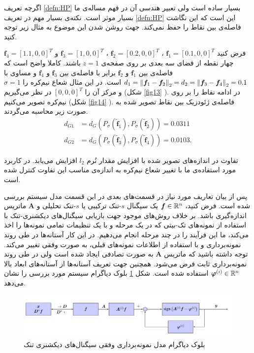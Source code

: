 اگرچه تعریف 
\eqref{defn:HP}
بسیار ساده است ولی تعبیر هندسی آن در فهم مساله‌ی ما بسیار موثر است. نکته‌ی بسیار مهم در تعریف
\eqref{defn:HP}
این است که این نگاشت فاصله‌ی بین نقاط را حفظ نمی‌کند. جهت روشن شدن این موضوع به مثال زیر توجه کنید.

فرض کنید 
$ \bm{f}_{1}=[0.1,0,0]^{T} $
،
$ \bm{f}_{2}=[0.2,0,0]^{T} $
،
$ \bm{f}_{3}=[1,0,0]^{T} $
و 
$ \bm{f}_{4}=[1.1,0,0]^{T} $
چهار نقطه از فضای سه بعدی بر روی صفحه‌ی
$ z=1 $
باشند. کاملا واضح است که فاصله‌ی بین 
 $ \bm{f}_{1} $
و
 $ \bm{f}_{2} $
برابر با فاصله‌ی بین
 $ \bm{f}_{3} $
و 
 $ \bm{f}_{4} $
و مساوی با
$ d_{1}=\left\lVert\bm{f}_{1}-\bm{f}_{2}\right\rVert_{2}=d_{2}=\left\lVert\bm{f}_{3}-\bm{f}_{4}\right\rVert_{2}= 0.1 $
است. در این مثال شعاع نیم‌کره را
$ \sigma =1  $
و مرکز آن را
$ [0,0,0]^{T} $ 
در نظر می‌گیریم (شکل
\ref{fig13}
).
در ادامه نقاط را بر روی نیم‌کره تصویر می‌کنیم (شکل
\ref{fig14}
). فاصله‌ی ژئودزیک بین نقاط تصویر شده به صورت زیر محاسبه می‌گردند.
\begin{align*}
	 d_{G1}&=d_{G}(P_{\sigma}(\tilde{\bm{f}}_{1}),P_{\sigma}(\tilde{\bm{f}}_{2}))= 0.0311\\
	 d_{G2}&=d_{G}(P_{\sigma}(\tilde{\bm{f}}_{3}),P_{\sigma}(\tilde{\bm{f}}_{4}))= 0.0103.
\end{align*}

تفاوت در اندازه‌های تصویر شده با افزایش مقدار نُرم 
$l_2$
افزایش می‌یابد. در کاربرد مورد استفاده‌ی ما با تغییر شعاع نیم‌کره به اندازه‌ی مناسب این تفاوت کنترل شده است.

پس از بیان تعاریف مورد نیاز در قسمت‌های بعدی در این قسمت مدل سیستم بررسی شده است.
فرض کنید، 
$ \bm{f}\in \mathbb{R}^{n} $
یک سیگنال
$s$-تنک ترکیبی
 یا
$s$-تنک تحلیلی
و 
$ \bm{A} $
ماتریس اندازه‌گیری باشد.
بر خلاف روش‌های موجود جهت بازیابی سیگنال‌های دیکشنری-تنک با استفاده از نمونه‌های تک-بیتی که در یک مرحله و با یک تنظیمات تمامی نمونه‌ها را اخذ می‌کند، ما این فرآیند را در چند مرحله انجام می‌دهیم. در این کار آستانه‌ها در طی روند نمونه‌برداری و با استفاده از اطلاعات نمونه‌های قبلی، به صورت وفقی تغییر می‌کند. توجه داشته باشید که ماتریس
$ \bm{A} $
به صورت تصادفی ایجاد شده است ولی در طی روند نمونه‌برداری ثابت فرض می‌شود. همچنین جهت تعریف آستانه‌ها از آستانه‌های ابعاد بالا 
$ \bm{\varphi}^{(i)}\in \mathbb{R}^{n} $
استفاده شده است.
 شکل 
\ref{fig15}
بلوک دیاگرام سیستم مورد بررسی را نشان می‌دهد.
\begin{figure}
	\centering
	\includegraphics[scale=0.4]{Images/ch3/fig15}
	\caption{بلوک دیاگرام مدل نمونه‌برداری وفقی سیگنال‌های دیکشنری تنک}
	\label{fig15}
\end{figure}

